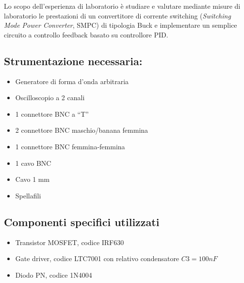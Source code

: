 Lo scopo dell'esperienza di laboratorio è studiare e valutare mediante misure di laboratorio le prestazioni di un convertitore di corrente switching (\textit{Switching Mode Power Converter}, SMPC) di tipologia Buck e implementare un semplice circuito a controllo feedback basato su controllore PID.
\subsection*{Strumentazione necessaria:}
\begin{itemize}
    \item Generatore di forma d'onda arbitraria
    \item Oscilloscopio a 2 canali
    \item 1 connettore BNC a “T”
	\item 2 connettore BNC maschio/banana femmina
	\item 1 connettore BNC femmina-femmina
	\item 1 cavo BNC
	\item Cavo 1 mm
	\item Spellafili
\end{itemize}
\subsection*{Componenti specifici utilizzati}
\begin{itemize}
    \item Transistor MOSFET, codice IRF630
    \item Gate driver, codice LTC7001 con relativo condensatore $C3=100nF$
    \item Diodo PN, codice 1N4004
\end{itemize}